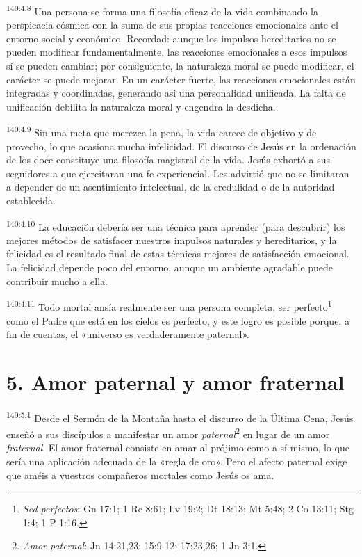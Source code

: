 \par 
\textsuperscript{140:4.8} Una persona se forma una filosofía eficaz de la vida combinando la perspicacia cósmica con la suma de sus propias reacciones emocionales ante el entorno social y económico. Recordad: aunque los impulsos hereditarios no se pueden modificar fundamentalmente, las reacciones emocionales a esos impulsos sí se pueden cambiar; por consiguiente, la naturaleza moral se puede modificar, el carácter se puede mejorar. En un carácter fuerte, las reacciones emocionales están integradas y coordinadas, generando así una personalidad unificada. La falta de unificación debilita la naturaleza moral y engendra la desdicha.

\par 
\textsuperscript{140:4.9} Sin una meta que merezca la pena, la vida carece de objetivo y de provecho, lo que ocasiona mucha infelicidad. El discurso de Jesús en la ordenación de los doce constituye una filosofía magistral de la vida. Jesús exhortó a sus seguidores a que ejercitaran una fe experiencial. Les advirtió que no se limitaran a depender de un asentimiento intelectual, de la credulidad o de la autoridad establecida.

\par 
\textsuperscript{140:4.10} La educación debería ser una técnica para aprender (para descubrir) los mejores métodos de satisfacer nuestros impulsos naturales y hereditarios, y la felicidad es el resultado final de estas técnicas mejores de satisfacción emocional. La felicidad depende poco del entorno, aunque un ambiente agradable puede contribuir mucho a ella.

\par 
\textsuperscript{140:4.11} Todo mortal ansía realmente ser una persona completa, ser perfecto\footnote{\textit{Sed perfectos}: Gn 17:1; 1 Re 8:61; Lv 19:2; Dt 18:13; Mt 5:48; 2 Co 13:11; Stg 1:4; 1 P 1:16.} como el Padre que está en los cielos es perfecto, y este logro es posible porque, a fin de cuentas, el «universo es verdaderamente paternal».

\section*{5. Amor paternal y amor fraternal}
\par 
\textsuperscript{140:5.1} Desde el Sermón de la Montaña hasta el discurso de la
Última Cena, Jesús enseñó a sus discípulos a manifestar un amor \textit{paternal}\footnote{\textit{Amor paternal}: Jn 14:21,23; 15:9-12; 17:23,26; 1 Jn 3:1.} en lugar de un amor \textit{fraternal}. El amor fraternal consiste en amar al prójimo como a sí mismo, lo que sería una aplicación adecuada de la «regla de oro». Pero el afecto paternal exige que améis a vuestros compañeros mortales como Jesús os ama.

